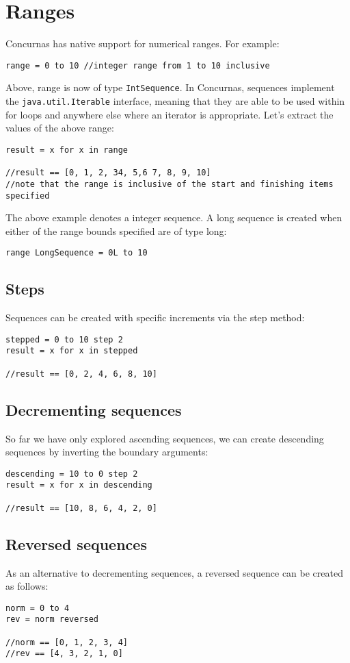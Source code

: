 \documentclass[conc-doc]{subfiles}
\begin{document}
	
	\chapter[Ranges]{Ranges}

Concurnas has native support for numerical ranges. For example:
\begin{lstlisting}
range = 0 to 10 //integer range from 1 to 10 inclusive
\end{lstlisting}

Above, range is now of type \lstinline{IntSequence}. In Concurnas, sequences implement the \lstinline{java.util.Iterable} interface, meaning that they are able to be used within for loops and anywhere else where an iterator is appropriate. Let's extract the values of the above range:
\begin{lstlisting}
result = x for x in range 

//result == [0, 1, 2, 34, 5,6 7, 8, 9, 10]
//note that the range is inclusive of the start and finishing items specified
\end{lstlisting}

The above example denotes a integer sequence. A long sequence is created when either of the range bounds specified are of type long:
\begin{lstlisting}
range LongSequence = 0L to 10
\end{lstlisting}

\section{Steps}
Sequences can be created with specific increments via the step method:
\begin{lstlisting}
stepped = 0 to 10 step 2
result = x for x in stepped 

//result == [0, 2, 4, 6, 8, 10]
\end{lstlisting}

\section{Decrementing sequences}
So far we have only explored ascending sequences, we can create descending sequences by inverting the boundary arguments:
\begin{lstlisting}
descending = 10 to 0 step 2
result = x for x in descending 

//result == [10, 8, 6, 4, 2, 0]
\end{lstlisting}

\section{Reversed sequences}
As an alternative to decrementing sequences, a reversed sequence can be created as follows:
\begin{lstlisting}
norm = 0 to 4
rev = norm reversed

//norm == [0, 1, 2, 3, 4]
//rev == [4, 3, 2, 1, 0]
\end{lstlisting}
\end{document}

